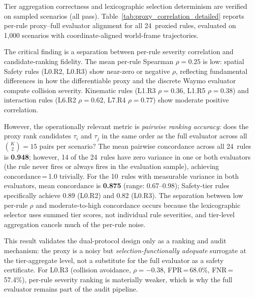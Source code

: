 Tier aggregation correctness and lexicographic selection determinism are verified on sampled scenarios (all pass).  Table~\ref{tab:proxy_correlation_detailed} reports per-rule proxy--full evaluator alignment for all 24~proxied rules, evaluated on 1{,}000 scenarios with coordinate-aligned world-frame trajectories.

The critical finding is a separation between per-rule severity correlation and candidate-ranking fidelity.  The mean per-rule Spearman $\rho{=}0.25$ is low: spatial Safety rules (L0.R2, L0.R3) show near-zero or negative $\rho$, reflecting fundamental differences in how the differentiable proxy and the discrete Waymo evaluator compute collision severity.  Kinematic rules (L1.R3 $\rho{=}0.36$, L1.R5 $\rho{=}0.38$) and interaction rules (L6.R2 $\rho{=}0.62$, L7.R4 $\rho{=}0.77$) show moderate positive correlation.

However, the operationally relevant metric is \emph{pairwise ranking accuracy}: does the proxy rank candidates $\tau_i$ and $\tau_j$ in the same order as the full evaluator across all $\binom{K}{2}{=}15$ pairs per scenario?  The mean pairwise concordance across all 24~rules is \textbf{0.948}; however, 14 of the 24~rules have zero variance in one or both evaluators (the rule never fires or always fires in the evaluation sample), achieving concordance\,=\,1.0 trivially.  For the 10~rules with measurable variance in both evaluators, mean concordance is \textbf{0.875} (range: 0.67--0.98); Safety-tier rules specifically achieve 0.89 (L0.R2) and 0.82 (L0.R3).  The separation between low per-rule $\rho$ and moderate-to-high concordance occurs because the lexicographic selector uses summed tier scores, not individual rule severities, and tier-level aggregation cancels much of the per-rule noise.

This result validates the dual-protocol design only as a ranking and audit mechanism: the proxy is a noisy but \emph{selection-functionally adequate} surrogate at the tier-aggregate level, not a substitute for the full evaluator as a safety certificate.  For L0.R3 (collision avoidance, $\rho{=}{-}0.38$, FPR\,=\,68.0\%, FNR\,=\,57.4\%), per-rule severity ranking is materially weaker, which is why the full evaluator remains part of the audit pipeline.

